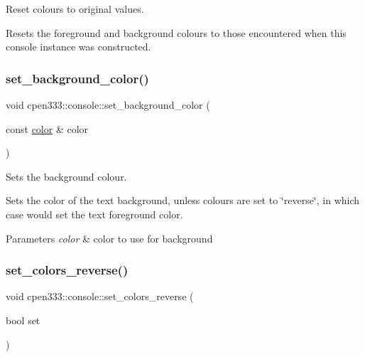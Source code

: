 Reset colours to original values. 

Resets the foreground and background colours to those encountered when this console instance was constructed. \mbox{\label{classcpen333_1_1console_a2328c0819515e1d3508cd1018f62c674}} 
\subsubsection{\texorpdfstring{set\+\_\+background\+\_\+color()}{set\_background\_color()}}
{\footnotesize\ttfamily void cpen333\+::console\+::set\+\_\+background\+\_\+color (\begin{DoxyParamCaption}\item[{const \hyperlink{console_8h_a915749711f4fc63cca8581af0c1106b3}{color} \&}]{color }\end{DoxyParamCaption})\hspace{0.3cm}{\ttfamily [inline]}}



Sets the background colour. 

Sets the color of the text background, unless colours are set to \char`\"{}reverse\char`\"{}, in which case would set the text foreground color. 
\begin{DoxyParams}{Parameters}
{\em color} & color to use for background \\
\hline
\end{DoxyParams}
\mbox{\label{classcpen333_1_1console_ae5cd5a356afeedd7f8cf96c2cbac3785}} 
\subsubsection{\texorpdfstring{set\+\_\+colors\+\_\+reverse()}{set\_colors\_reverse()}}
{\footnotesize\ttfamily void cpen333\+::console\+::set\+\_\+colors\+\_\+reverse (\begin{DoxyParamCaption}\item[{bool}]{set }\end{DoxyParamCaption})\hspace{0.3cm}{\ttfamily [inline]}}



